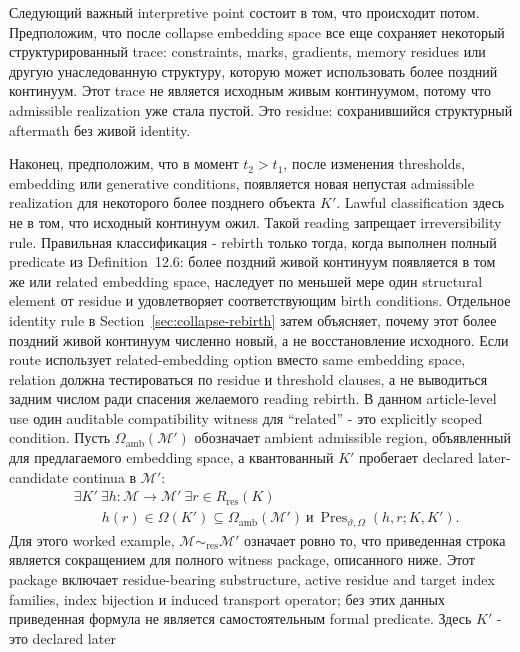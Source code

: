 Следующий важный interpretive point состоит в том, что происходит потом.
Предположим, что после collapse embedding space все еще сохраняет некоторый
структурированный trace: constraints, marks, gradients, memory residues или
другую унаследованную структуру, которую может использовать более поздний
континуум. Этот trace не является исходным живым континуумом, потому что
admissible realization уже стала пустой. Это residue: сохранившийся
структурный aftermath без живой identity.

Наконец, предположим, что в момент \(t_2>t_1\), после изменения thresholds,
embedding или generative conditions, появляется новая непустая admissible
realization для некоторого более позднего объекта \(K'\). Lawful
classification здесь не в том, что исходный континуум ожил. Такой reading
запрещает irreversibility rule. Правильная классификация - rebirth только
тогда, когда выполнен полный predicate из Definition~12.6: более поздний
живой континуум появляется в том же или related embedding space, наследует
по меньшей мере один structural element от residue и удовлетворяет
соответствующим birth conditions. Отдельное identity rule в
Section~\ref{sec:collapse-rebirth} затем объясняет, почему этот более поздний
живой континуум численно новый, а не восстановление исходного.
Если route использует related-embedding option вместо same embedding space,
relation должна тестироваться по residue и threshold clauses, а не
выводиться задним числом ради спасения желаемого reading rebirth. В данном
article-level use один auditable compatibility witness для ``related'' -
это explicitly scoped condition. Пусть \(\Omega_{\mathrm{amb}}(\mathcal{M}')\)
обозначает ambient admissible region, объявленный для предлагаемого
embedding space, а квантованный \(K'\) пробегает declared later-candidate
continua в \(\mathcal{M}'\):
\[
  \begin{aligned}
  &\exists K'\ \exists h:\mathcal{M}\to\mathcal{M}'\ \exists r\in R_{\mathrm{res}}(K)\\
  &\qquad h(r)\in\Omega(K')\subseteq\Omega_{\mathrm{amb}}(\mathcal{M}')\ \text{и}\
  \operatorname{Pres}_{\vartheta,\Omega}(h,r;K,K').
  \end{aligned}
\]
Для этого worked example, \(\mathcal{M}\sim_{\mathrm{res}}\mathcal{M}'\)
означает ровно то, что приведенная строка является сокращением для полного
witness package, описанного ниже. Этот package включает residue-bearing
substructure, active residue and target index families, index bijection и
induced transport operator; без этих данных приведенная формула не является
самостоятельным formal predicate. Здесь \(K'\) - это declared later
